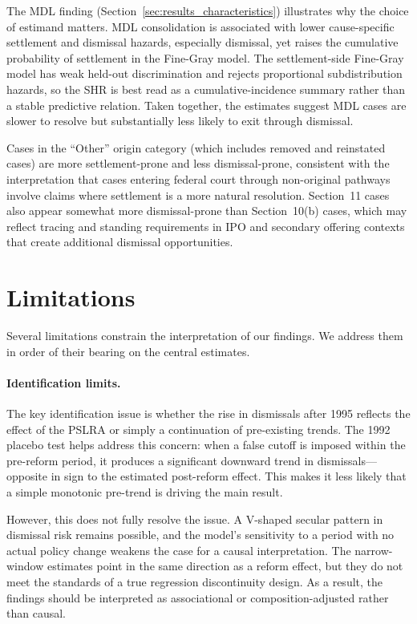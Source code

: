 The MDL finding (Section~\ref{sec:results_characteristics})
illustrates why the choice of estimand matters. MDL
consolidation is associated with lower cause-specific
settlement and dismissal hazards, especially dismissal, yet
raises the cumulative probability of settlement in the
Fine-Gray model. The settlement-side Fine-Gray model has weak
held-out discrimination and rejects proportional
subdistribution hazards, so the SHR is best read as a
cumulative-incidence summary rather than a stable predictive
relation. Taken together, the estimates suggest MDL cases are
slower to resolve but substantially less likely to exit
through dismissal.

Cases in the ``Other'' origin category (which includes
removed and reinstated cases) are more settlement-prone and
less dismissal-prone, consistent with the interpretation that
cases entering federal court through non-original pathways
involve claims where settlement is a more natural resolution.
Section~11 cases also appear somewhat more dismissal-prone
than Section~10(b) cases, which may reflect tracing and
standing requirements in IPO and secondary offering contexts
that create additional dismissal opportunities.

\section{Limitations}
\label{sec:limitations}

Several limitations constrain the interpretation of our findings. We address them in order of their bearing on the central
estimates.

\paragraph{Identification limits.}
The key identification issue is whether the rise in dismissals after 1995 reflects the effect of the PSLRA or simply a continuation of pre-existing trends. The 1992 placebo test helps address this concern: when a false cutoff is imposed within the pre-reform period, it produces a significant downward trend in dismissals—opposite in sign to the estimated post-reform effect. This makes it less likely that a simple monotonic pre-trend is driving the main result.

However, this does not fully resolve the issue. A V-shaped secular pattern in dismissal risk remains possible, and the model’s sensitivity to a period with no actual policy change weakens the case for a causal interpretation. The narrow-window estimates point in the same direction as a reform effect, but they do not meet the standards of a true regression discontinuity design. As a result, the findings should be interpreted as associational or composition-adjusted rather than causal.


